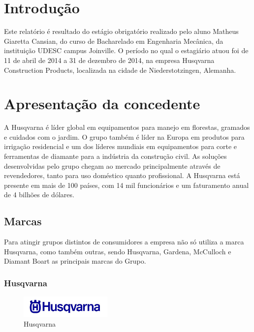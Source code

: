 \documentclass[12pt]{article}
\begin{document}
\setcounter{page}{13}

\section{Introdução}

	Este relatório é resultado do estágio obrigatório realizado pelo aluno Matheus Giaretta Cansian, do curso de Bacharelado em Engenharia Mecânica, da instituição UDESC campus Joinville.
	O período no qual o estagiário atuou foi de 11 de abril de 2014 a 31 de dezembro de 2014, na empresa Husqvarna Construction Products, localizada na cidade de Niederstotzingen, Alemanha.
\pagebreak

\section{Apresentação da concedente}

	A Husqvarna é líder global em equipamentos para manejo em florestas, gramados e cuidados com o jardim. O grupo também é líder na Europa em produtos para irrigação residencial e um dos líderes mundiais em equipamentos para corte e ferramentas de diamante para a indústria da construção civil. As soluções desenvolvidas pelo grupo chegam ao mercado principalmente através de revendedores, tanto para uso doméstico quanto profissional. A Husqvarna está presente em mais de 100 países, com 14 mil funcionários e um faturamento anual de 4 bilhões de dólares.

\subsection{Marcas}

	Para atingir grupos distintos de consumidores a empresa não só utiliza a marca Husqvarna, como também outras, sendo Husqvarna, Gardena, McCulloch e Diamant Boart as principais marcas do Grupo.

\subsubsection{Husqvarna}

\begin{figure}[h!]
	\centering
	\includegraphics[width=0.4\textwidth]{img/logo-husqvarna.png}
	\caption{Husqvarna}
\end{figure}
\end{document}
